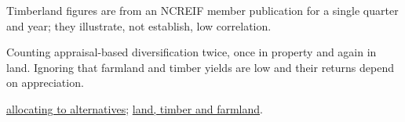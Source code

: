 \begin{qfmethod}
 Timberland figures are from an NCREIF member publication for a single quarter and year; they illustrate, not establish, low correlation.

 Counting appraisal-based diversification twice, once in property and again in land. Ignoring that farmland and timber yields are low and their returns depend on appreciation.

 \hyperref[meth:alternatives-allocation-approaches]{allocating to alternatives}; \hyperref[meth:land-timber-farmland]{land, timber and farmland}.

\end{qfmethod}
